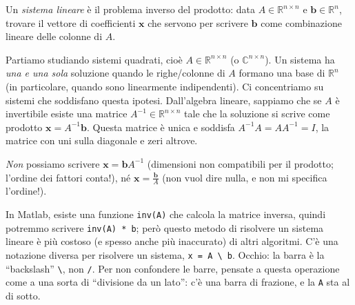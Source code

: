 \documentclass[a4paper]{report}
\theoremstyle{definiton}
\theoremstyle{remark}
\begin{document}


Un \emph{sistema lineare} è il problema inverso del prodotto: data $A\in\mathbb{R}^{n\times n}$ e $\mathbf{b} \in \mathbb{R}^n$, trovare il vettore di coefficienti $\mathbf{x}$ che servono per scrivere $\mathbf{b}$ come combinazione lineare delle colonne di $A$.

Partiamo studiando sistemi quadrati, cioè $A \in \mathbb{R}^{n\times n}$ (o $\mathbb{C}^{n\times n}$). Un sistema ha \emph{una e una sola} soluzione quando le righe/colonne di $A$ formano una base di $\mathbb{R}^n$ (in particolare, quando sono linearmente indipendenti). Ci concentriamo su sistemi che soddisfano questa ipotesi. Dall'algebra lineare, sappiamo che se $A$ è invertibile esiste una matrice $A^{-1}\in\mathbb{R}^{n\times n}$ tale che la soluzione si scrive come prodotto $\mathbf{x} = A^{-1}\mathbf{b}$. Questa matrice è unica e soddisfa $A^{-1}A=AA^{-1}= I$, la matrice con uni sulla diagonale e zeri altrove.

\emph{Non} possiamo scrivere $\mathbf{x} = \mathbf{b}A^{-1}$ (dimensioni non compatibili per il prodotto; l'ordine dei fattori conta!), né $\mathbf{x} = \frac{\mathbf{b}}{A}$ (non vuol dire nulla, e non mi specifica l'ordine!).

In Matlab, esiste una funzione \lstinline{inv(A)} che calcola la matrice inversa, quindi potremmo scrivere \lstinline{inv(A) * b}; però questo metodo di risolvere un sistema lineare è più costoso (e spesso anche più inaccurato) di altri algoritmi. C'è una notazione diversa per risolvere un sistema, \lstinline{x = A \ b}. Occhio: la barra è la ``backslash'' \lstinline!\!, non \lstinline{/}. Per non confondere le barre, pensate a questa operazione come a una sorta di ``divisione da un lato'': c'è una barra di frazione, e la \lstinline{A} sta al di sotto.
\end{document}
